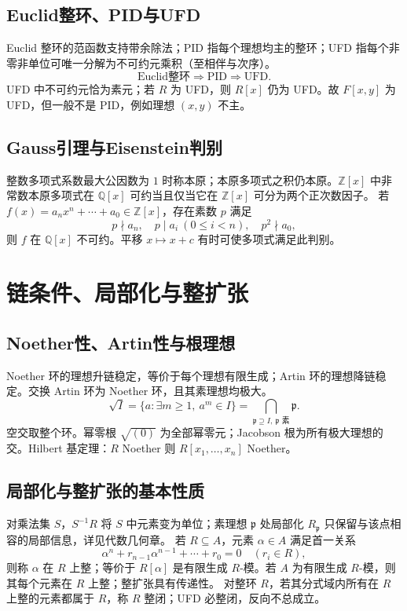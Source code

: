 \documentclass[../main.tex]{subfiles}
\begin{document}
\subsection{Euclid整环、PID与UFD}
Euclid 整环的范函数支持带余除法；PID 指每个理想均主的整环；UFD 指每个非零非单位可唯一分解为不可约元乘积（至相伴与次序）。
\[
\text{Euclid整环}\Longrightarrow\text{PID}\Longrightarrow\text{UFD}.
\]
UFD 中不可约元恰为素元；若 $R$ 为 UFD，则 $R[x]$ 仍为 UFD。故 $F[x,y]$ 为 UFD，但一般不是 PID，例如理想 $(x,y)$ 不主。
\subsection{Gauss引理与Eisenstein判别}
整数多项式系数最大公因数为 $1$ 时称本原；本原多项式之积仍本原。$\mathbb Z[x]$ 中非常数本原多项式在 $\mathbb Q[x]$ 可约当且仅当它在 $\mathbb Z[x]$ 可分为两个正次数因子。
若 $f(x)=a_nx^n+\cdots+a_0\in\mathbb Z[x]$，存在素数 $p$ 满足
\[
p\nmid a_n,\quad p\mid a_i\ (0\le i<n),\quad p^2\nmid a_0,
\]
则 $f$ 在 $\mathbb Q[x]$ 不可约。平移 $x\mapsto x+c$ 有时可使多项式满足此判别。
\section{链条件、局部化与整扩张}
\subsection{Noether性、Artin性与根理想}
Noether 环的理想升链稳定，等价于每个理想有限生成；Artin 环的理想降链稳定。交换 Artin 环为 Noether 环，且其素理想均极大。
\[
\sqrt I=\{a:\exists m\ge1,\ a^m\in I\}
=\bigcap_{\mathfrak p\supseteq I,\ \mathfrak p\text{ 素}}\mathfrak p.
\]
空交取整个环。幂零根 $\sqrt{(0)}$ 为全部幂零元；Jacobson 根为所有极大理想的交。Hilbert 基定理：$R$ Noether 则 $R[x_1,\ldots,x_n]$ Noether。
\subsection{局部化与整扩张的基本性质}
对乘法集 $S$，$S^{-1}R$ 将 $S$ 中元素变为单位；素理想 $\mathfrak p$ 处局部化 $R_{\mathfrak p}$ 只保留与该点相容的局部信息，详见代数几何章。
若 $R\subseteq A$，元素 $\alpha\in A$ 满足首一关系
\[
\alpha^n+r_{n-1}\alpha^{n-1}+\cdots+r_0=0\quad(r_i\in R),
\]
则称 $\alpha$ 在 $R$ 上整；等价于 $R[\alpha]$ 是有限生成 $R$-模。若 $A$ 为有限生成 $R$-模，则其每个元素在 $R$ 上整；整扩张具有传递性。
对整环 $R$，若其分式域内所有在 $R$ 上整的元素都属于 $R$，称 $R$ 整闭；UFD 必整闭，反向不总成立。
\end{document}
